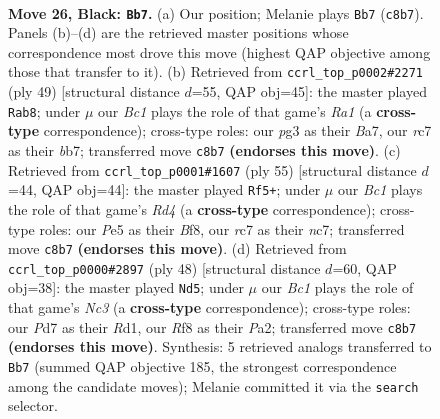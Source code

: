 \documentclass[11pt]{article}
\begin{document}
\clearpage

\begin{figure}[p]\centering
\begin{subfigure}{0.46\textwidth}\centering
\resizebox{\linewidth}{!}{%
\newchessgame
\chessboard[
  setfen={1rb2r2/p1Rp1pk1/8/4p2p/8/5nP1/PP2KP1P/2B2B1R b - - 1 26},
  showmover=false,
  pgfstyle=straightmove, color=movearrow, markmove={c8-b7}
]}
\caption{}
\end{subfigure}\hfill
\begin{subfigure}{0.46\textwidth}\centering
\resizebox{\linewidth}{!}{%
\newchessgame
\chessboard[
  setfen={r2r4/bB2kppp/p3p3/8/PP6/8/4nPPP/R1B1RK2 b - - 2 25},
  showmover=false,
  pgfstyle=straightmove, color=movearrow, markmove={a8-b8}
]}
\caption{}
\end{subfigure}
\\[4pt]
\begin{subfigure}{0.46\textwidth}\centering
\resizebox{\linewidth}{!}{%
\newchessgame
\chessboard[
  setfen={5b1r/2N2k2/1p2pp2/2pr4/8/2P3nP/PP3KP1/R1B1R3 b - - 8 28},
  showmover=false,
  pgfstyle=straightmove, color=movearrow, markmove={d5-f5}
]}
\caption{}
\end{subfigure}\hfill
\begin{subfigure}{0.46\textwidth}\centering
\resizebox{\linewidth}{!}{%
\newchessgame
\chessboard[
  setfen={r5k1/4rpbp/1Rb3p1/p7/3pP3/2N4P/P4PP1/3R1BK1 w - - 0 25},
  showmover=false,
  pgfstyle=straightmove, color=movearrow, markmove={c3-d5}
]}
\caption{}
\end{subfigure}
\caption{\textbf{Move 26, Black: \texttt{Bb7}.} (a) Our position; Melanie plays \texttt{Bb7} (\texttt{c8b7}). Panels (b)--(d) are the retrieved master positions whose correspondence most drove this move (highest QAP objective among those that transfer to it). (b) Retrieved from \texttt{ccrl\_top\_p0002\#2271} (ply 49) [structural distance $d$=55, QAP obj=45]: the master played \texttt{Rab8}; under $\mu$ our \emph{Bc1} plays the role of that game's \emph{Ra1} (a \textbf{cross-type} correspondence); cross-type roles: our \emph{p}g3 as their \emph{B}a7, our \emph{r}c7 as their \emph{b}b7; transferred move \texttt{c8b7} \textbf{(endorses this move)}. (c) Retrieved from \texttt{ccrl\_top\_p0001\#1607} (ply 55) [structural distance $d$=44, QAP obj=44]: the master played \texttt{Rf5+}; under $\mu$ our \emph{Bc1} plays the role of that game's \emph{Rd4} (a \textbf{cross-type} correspondence); cross-type roles: our \emph{P}e5 as their \emph{B}f8, our \emph{r}c7 as their \emph{n}c7; transferred move \texttt{c8b7} \textbf{(endorses this move)}. (d) Retrieved from \texttt{ccrl\_top\_p0000\#2897} (ply 48) [structural distance $d$=60, QAP obj=38]: the master played \texttt{Nd5}; under $\mu$ our \emph{Bc1} plays the role of that game's \emph{Nc3} (a \textbf{cross-type} correspondence); cross-type roles: our \emph{P}d7 as their \emph{R}d1, our \emph{R}f8 as their \emph{P}a2; transferred move \texttt{c8b7} \textbf{(endorses this move)}. Synthesis: 5 retrieved analogs transferred to \texttt{Bb7} (summed QAP objective 185, the strongest correspondence among the candidate moves); Melanie committed it via the \texttt{search} selector.}
\label{fig:thought-m51}
\end{figure}
\end{document}
